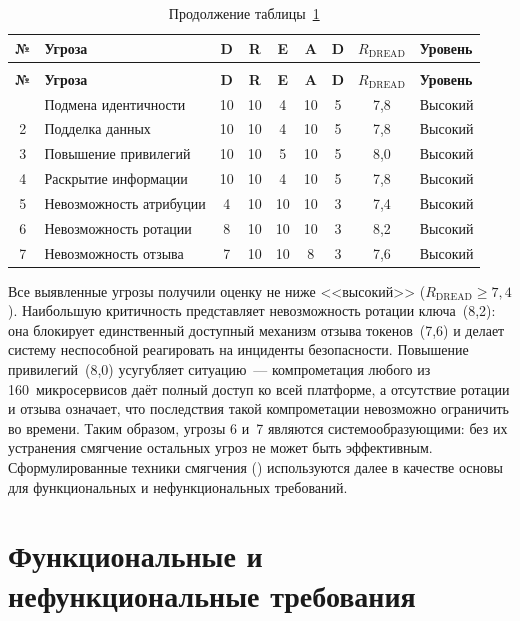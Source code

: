 \begin{longtable}{|c|p{4cm}|c|c|c|c|c|c|l|}
  \caption{Оценка угроз по модели DREAD}
  \label{tab:dread-scores} \\
  \hline
  \textbf{№} & \textbf{Угроза} & \textbf{D} & \textbf{R} & \textbf{E} & \textbf{A} & \textbf{D} & $R_{\text{DREAD}}$ & \textbf{Уровень} \\
  \hline
  \endfirsthead
  \caption*{Продолжение таблицы~\ref{tab:dread-scores}} \\
  \hline
  \textbf{№} & \textbf{Угроза} & \textbf{D} & \textbf{R} & \textbf{E} & \textbf{A} & \textbf{D} & $R_{\text{DREAD}}$ & \textbf{Уровень} \\
  \hline
  \endhead
  \hline
  \endfoot
  1 & Подмена идентичности & 10 & 10 & 4 & 10 & 5 & 7,8 & Высокий \\
  \hline
  2 & Подделка данных & 10 & 10 & 4 & 10 & 5 & 7,8 & Высокий \\
  \hline
  3 & Повышение привилегий & 10 & 10 & 5 & 10 & 5 & 8,0 & Высокий \\
  \hline
  4 & Раскрытие информации & 10 & 10 & 4 & 10 & 5 & 7,8 & Высокий \\
  \hline
  5 & Невозможность атрибуции & 4 & 10 & 10 & 10 & 3 & 7,4 & Высокий \\
  \hline
  6 & Невозможность ротации & 8 & 10 & 10 & 10 & 3 & 8,2 & Высокий \\
  \hline
  7 & Невозможность отзыва & 7 & 10 & 10 & 8 & 3 & 7,6 & Высокий \\
\end{longtable}

Все выявленные угрозы получили оценку не ниже <<высокий>> ($R_{\text{DREAD}} \geq 7{,}4$).
Наибольшую критичность представляет невозможность ротации ключа~(8,2):
она блокирует единственный доступный механизм отзыва токенов~(7,6)
и делает систему неспособной реагировать на инциденты безопасности.
Повышение привилегий~(8,0) усугубляет ситуацию~---
компрометация любого из 160~микросервисов даёт полный доступ ко всей платформе,
а отсутствие ротации и отзыва означает,
что последствия такой компрометации невозможно ограничить во времени.
Таким образом, угрозы 6 и~7 являются системообразующими:
без их устранения смягчение остальных угроз не может быть эффективным.
Сформулированные техники смягчения ()
используются далее в качестве основы для функциональных и нефункциональных требований.

\section{Функциональные и нефункциональные требования}\label{sec:requirements}

